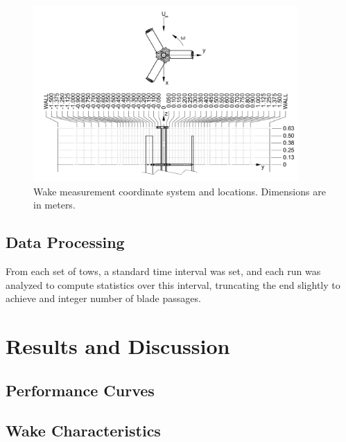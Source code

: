 \documentclass[energies,article,accept,moreauthors,pdftex,12pt,a4paper]{mdpi}
\begin{document}
\begin{figure}
\centering
\includegraphics[width=0.9\textwidth]{figures/turbine_coordinate_system}
\caption{Wake measurement coordinate system and locations. Dimensions are in
meters.} 
\label{fig:wake_locations}
\end{figure}

\subsection{Data Processing}

From each set of tows, a standard time interval was set, and each run was
analyzed to compute statistics over this interval, truncating the end slightly
to achieve and integer number of blade passages.



\section{Results and Discussion}


\subsection{Performance Curves}



\subsection{Wake Characteristics}

\end{document}
